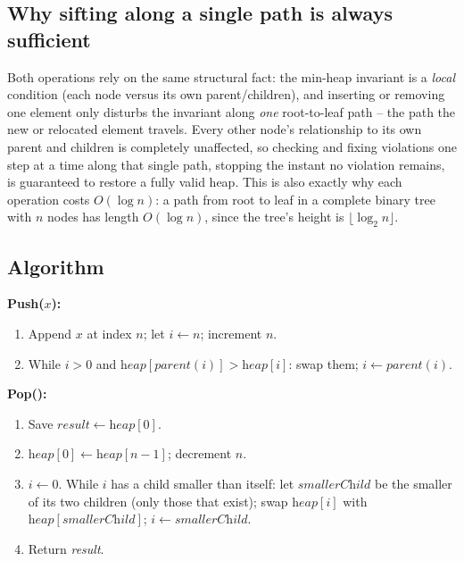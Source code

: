 \subsection*{Why sifting along a single path is always sufficient}

Both operations rely on the same structural fact: the min-heap invariant
is a \emph{local} condition (each node versus its own parent/children),
and inserting or removing one element only disturbs the invariant along
\emph{one} root-to-leaf path -- the path the new or relocated element
travels. Every other node's relationship to its own parent and children is
completely unaffected, so checking and fixing violations one step at a
time along that single path, stopping the instant no violation remains, is
guaranteed to restore a fully valid heap. This is also exactly why each
operation costs $O(\log n)$: a path from root to leaf in a complete binary
tree with $n$ nodes has length $O(\log n)$, since the tree's height is
$\lfloor \log_2 n \rfloor$.

\subsection*{Algorithm}

\textbf{Push($x$):}
\begin{enumerate}
  \item Append $x$ at index $n$; let $i \gets n$; increment $n$.
  \item While $i > 0$ and $\textit{heap}[\textit{parent}(i)] >
        \textit{heap}[i]$: swap them; $i \gets \textit{parent}(i)$.
\end{enumerate}

\textbf{Pop():}
\begin{enumerate}
  \item Save $\textit{result} \gets \textit{heap}[0]$.
  \item $\textit{heap}[0] \gets \textit{heap}[n-1]$; decrement $n$.
  \item $i \gets 0$. While $i$ has a child smaller than itself: let
        $\textit{smallerChild}$ be the smaller of its two children (only
        those that exist); swap $\textit{heap}[i]$ with
        $\textit{heap}[\textit{smallerChild}]$; $i \gets
        \textit{smallerChild}$.
  \item Return \textit{result}.
\end{enumerate}

